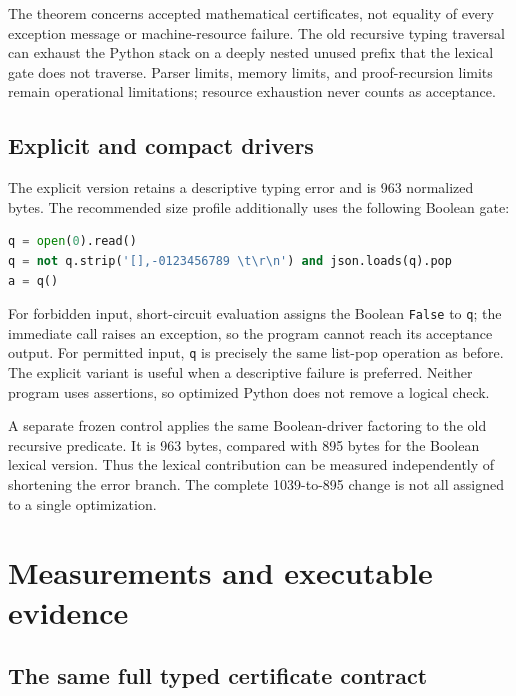 \documentclass[11pt,a4paper]{article}
\theoremstyle{definition}\newtheorem{definition}[theorem]{Definition}
\begin{document}
The theorem concerns accepted mathematical certificates, not equality of
every exception message or machine-resource failure. The old recursive
typing traversal can exhaust the Python stack on a deeply nested unused
prefix that the lexical gate does not traverse. Parser limits, memory
limits, and proof-recursion limits remain operational limitations;
resource exhaustion never counts as acceptance.

\subsection{Explicit and compact drivers}

The explicit version retains a descriptive typing error and is 963
normalized bytes. The recommended size profile additionally uses the
following Boolean gate:
\begin{lstlisting}[language=Python]
q = open(0).read()
q = not q.strip('[],-0123456789 \t\r\n') and json.loads(q).pop
a = q()
\end{lstlisting}
For forbidden input, short-circuit evaluation assigns the Boolean
\texttt{False} to \texttt{q}; the immediate call raises an exception, so
the program cannot reach its acceptance output. For permitted input,
\texttt{q} is precisely the same list-pop operation as before. The
explicit variant is useful when a descriptive failure is preferred.
Neither program uses assertions, so optimized Python does not remove a
logical check.

A separate frozen control applies the same Boolean-driver factoring to
the old recursive predicate. It is 963 bytes, compared with 895 bytes for
the Boolean lexical version. Thus the lexical contribution can be
measured independently of shortening the error branch. The complete
1039-to-895 change is not all assigned to a single optimization.

\section{Measurements and executable evidence}
\label{sec:measurements}

\subsection{The same full typed certificate contract}
\end{document}
